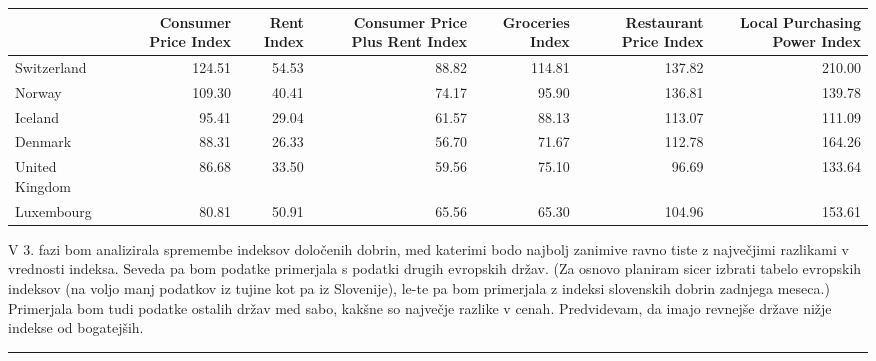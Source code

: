 \documentclass[]{article}
\begin{document}
\begin{longtable}[c]{@{}lrrrrrr@{}}
\toprule
& Consumer Price Index & Rent Index & Consumer Price Plus Rent Index &
Groceries Index & Restaurant Price Index & Local Purchasing Power
Index\tabularnewline
\midrule
\endhead
Switzerland & 124.51 & 54.53 & 88.82 & 114.81 & 137.82 &
210.00\tabularnewline
Norway & 109.30 & 40.41 & 74.17 & 95.90 & 136.81 & 139.78\tabularnewline
Iceland & 95.41 & 29.04 & 61.57 & 88.13 & 113.07 & 111.09\tabularnewline
Denmark & 88.31 & 26.33 & 56.70 & 71.67 & 112.78 & 164.26\tabularnewline
United Kingdom & 86.68 & 33.50 & 59.56 & 75.10 & 96.69 &
133.64\tabularnewline
Luxembourg & 80.81 & 50.91 & 65.56 & 65.30 & 104.96 &
153.61\tabularnewline
\bottomrule
\end{longtable}

V 3. fazi bom analizirala spremembe indeksov določenih dobrin, med
katerimi bodo najbolj zanimive ravno tiste z največjimi razlikami v
vrednosti indeksa. Seveda pa bom podatke primerjala s podatki drugih
evropskih držav. (Za osnovo planiram sicer izbrati tabelo evropskih
indeksov (na voljo manj podatkov iz tujine kot pa iz Slovenije), le-te
pa bom primerjala z indeksi slovenskih dobrin zadnjega meseca.)
Primerjala bom tudi podatke ostalih držav med sabo, kakšne so največje
razlike v cenah. Predvidevam, da imajo revnejše države nižje indekse od
bogatejših.

\begin{center}\rule{0.5\linewidth}{\linethickness}\end{center}
\end{document}
